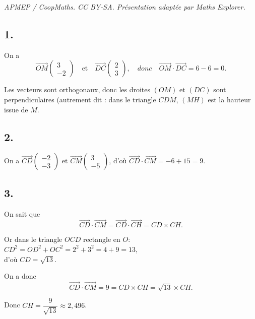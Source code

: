 \documentclass[10pt]{article}
\begin{document}
\noindent\textit{APMEP / CoopMaths. CC BY-SA. Présentation adaptée par Maths Explorer.}\par\medskip
\subsection*{1.}
	
	On a
	\[
	\overrightarrow{OM} \left( \begin{array}{c} 3 \\ -2 \end{array} \right) \quad \text{et} \quad \overrightarrow{DC} \left( \begin{array}{c} 2 \\ 3 \end{array} \right), \quad donc \quad \overrightarrow{OM} \cdot \overrightarrow{DC} = 6 - 6 = 0.
	\]
	
	Les vecteurs sont orthogonaux, donc les droites \((OM)\) et \((DC)\) sont perpendiculaires (autrement dit : dans le triangle \(CDM\), \((MH)\) est la hauteur issue de \(M\).
	
	\subsection*{2.}
	
	On a
$\overrightarrow{CD} \left( \begin{array}{c} -2 \\ -3 \end{array} \right)$ et  $\overrightarrow{CM} \left( \begin{array}{c} 3 \\ -5 \end{array} \right)$,  d'où  $\overrightarrow{CD} \cdot \overrightarrow{CM} = -6 + 15 = 9$.
	
	
	\subsection*{3.}
	
	On sait que
	\[
	\overrightarrow{CD} \cdot \overrightarrow{CM} = \overrightarrow{CD} \cdot \overrightarrow{CH} = CD \times CH.
	\]
	
	Or dans le triangle $OCD$ rectangle en \(O\):\\
	 \(CD^2 = OD^2 + OC^2 = 2^2 + 3^2 = 4 + 9 = 13\),\\ d'où \(CD = \sqrt{13}\).
	
	On a donc
	\[
	\overrightarrow{CD} \cdot \overrightarrow{CM} = 9 = CD \times CH = \sqrt{13} \times CH.
	\]
	
	Donc \(CH = \dfrac{9}{\sqrt{13}} \approx 2,496\).
\end{document}
